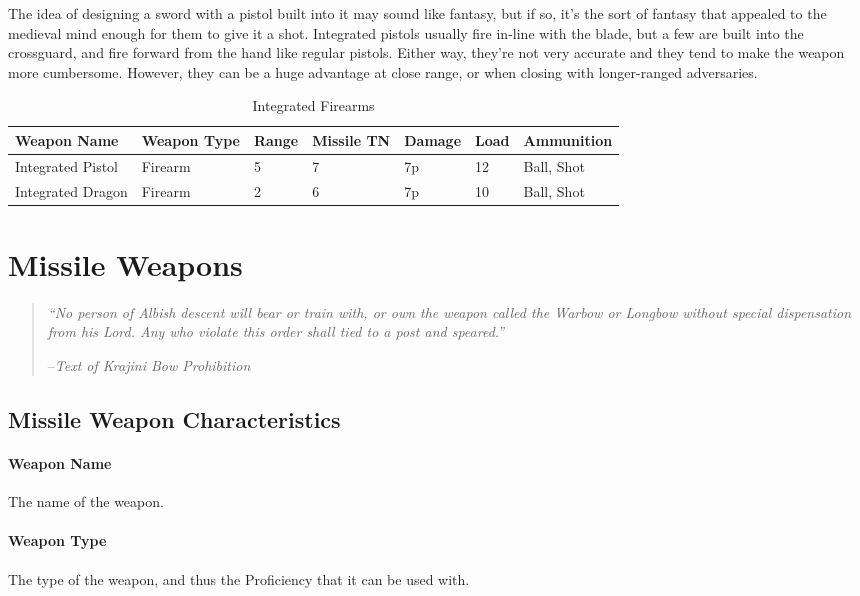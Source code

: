 \documentclass[oneside,11pt,english]{book}
\begin{document}
The idea of designing a sword with a pistol built into it may sound like fantasy, but if so, it’s the sort of fantasy that appealed to the medieval mind enough for them to give it a shot. Integrated pistols usually fire in-line with the blade, but a few are built into the crossguard, and fire forward from the hand like regular pistols. Either way, they’re not very accurate and they tend to make the weapon more cumbersome. However, they can be a huge advantage at close range, or when closing with longer-ranged adversaries.
\begin{table}[!ht]
	\caption{Integrated Firearms}
	\label{tab:Integrated Firearms}
	\begin{tabu} to 
Weapon Name &Weapon Type &Range &Missile TN &Damage &Load &Ammunition\\\toprule
Integrated Pistol &Firearm &5 &7 &7p &12 &Ball, Shot\\
Integrated Dragon &Firearm &2 &6 &7p &10 &Ball, Shot\\
	\end{tabu}
\end{table}

\chapter{Missile Weapons}\label{ch:Missile Weapons}
\startcontents[chapters]
\clearpage
\begin{quote}
\emph{“No person of Albish descent will bear or train with, or own the weapon called the Warbow or Longbow without special dispensation from his Lord. Any who violate this order shall tied to a post and speared.” }

--\textit{Text of Krajini Bow Prohibition}
\end{quote}

\section{Missile Weapon Characteristics}
\subsubsection{Weapon Name}
The name of the weapon.

\subsubsection{Weapon Type}
The type of the weapon, and thus the Proficiency that it can be used with. 
\end{document}
